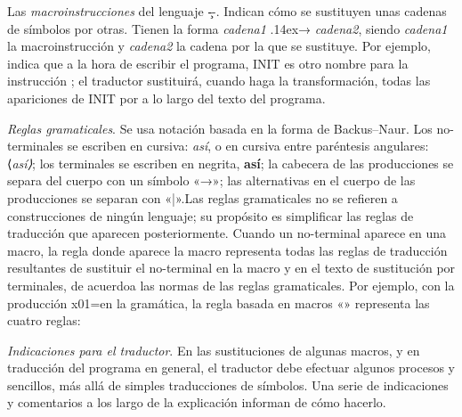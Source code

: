 \listademos
{}

Las {\it macroinstrucciones} del lenguaje \c--. Indican cómo se sustituyen unas cadenas de símbolos
por otras. Tienen la forma {\hskip3pt{\it cadena1} {\fflecha\lower.14ex\hbox{→}} {\it cadena2}},
siendo {\it cadena1} la macroinstrucción y {\it cadena2} la cadena por la que se sustituye. Por
ejemplo,  indica que a la hora de escribir el programa, {\fcode INIT} es otro
nombre para la instrucción {}; el traductor sustituirá, cuando haga la transformación, todas
las apariciones de {\fcode INIT} por {} a lo largo del texto del programa.

{\it Reglas gramaticales}. Se usa notación basada en la forma de Backus–Naur.  Los no-terminales se
escriben en cursiva: {\it así}, o en cursiva entre paréntesis angulares: {\fcode⟨\it así\fcode⟩};
los terminales se escriben en negrita, {\bf así}; la cabecera de las producciones se separa del
cuerpo con un símbolo «→»; las alternativas en el cuerpo de las producciones se separan con
«{\fcode|}».\pseudopar Las reglas gramaticales no se refieren a construcciones de ningún lenguaje;
su propósito es simplificar las reglas de traducción que aparecen posteriormente. Cuando un
no-terminal aparece en una macro, la regla donde aparece la macro representa todas las reglas de
traducción resultantes de sustituir el no-terminal en la macro y en el texto de sustitución por
terminales, de acuerdoa las normas de las reglas gramaticales. Por ejemplo, con la
producción \gramatprod x01=\estrella \fin en la gramática, la regla basada en macros
{\def\supuno{\super{\fsup1}}«\macroins{\fcodenoterm x\supuno}{\fcodenoterm x}» representa las cuatro
reglas:\hfil\break{\def\mk{\kern-.2em}\hbadness=10000\hbox to 3.4in{\vbox to 18pt{}\hskip9.5pt\macroins{1\supuno\mk}{1}; \macroins{0\supuno\mk}{0};
\macroins{=\supuno\mk}{=}; \macroins{\estrella\supuno\mk}{\estrella}.}}}

{\it Indicaciones para el traductor}. En las sustituciones de algunas macros, y en traducción del
programa en general, el traductor debe efectuar algunos procesos y sencillos, más allá de simples
traducciones de símbolos. Una serie de indicaciones y comentarios a los largo de la explicación
informan de cómo hacerlo.

